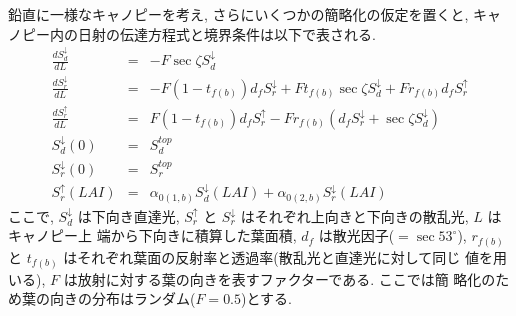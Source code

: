 鉛直に一様なキャノピーを考え, さらにいくつかの簡略化の仮定を置くと, キャ
ノピー内の日射の伝達方程式と境界条件は以下で表される. 
\begin{eqnarray}
 \frac{dS^{\downarrow}_d}{dL} &=& -F \sec\zeta S^{\downarrow}_d \\
 \frac{dS^{\downarrow}_r}{dL} &=& -F (1-t_{f(b)})d_f S^{\downarrow}_r
                                  +F t_{f(b)} \sec\zeta S^{\downarrow}_d 
                                  +F r_{f(b)} d_f S^{\uparrow}_r \\
 \frac{dS^{\uparrow}_r}{dL}   &=&  F (1-t_{f(b)})d_f S^{\uparrow}_r
                                  -F r_{f(b)} ( d_f S^{\downarrow}_r 
                                         + \sec\zeta S^{\downarrow}_d ) \\
 S^{\downarrow}_d(0) &=& S^{top}_d \\
 S^{\downarrow}_r(0) &=& S^{top}_r \\
 S^{\uparrow}_r(LAI) &=& \alpha_{0(1,b)}S^{\downarrow}_d(LAI)
                       + \alpha_{0(2,b)}S^{\downarrow}_r(LAI)
\end{eqnarray}
ここで, $S^{\downarrow}_d$ は下向き直達光, $S^{\uparrow}_r$ と
$S^{\downarrow}_r$ はそれぞれ上向きと下向きの散乱光, $L$ はキャノピー上
端から下向きに積算した葉面積, $d_f$ は散光因子($=\sec 53^{\circ}$),
$r_{f(b)}$ と $t_{f(b)}$ はそれぞれ葉面の反射率と透過率(散乱光と直達光に対して同じ
値を用いる), $F$ は放射に対する葉の向きを表すファクターである. ここでは簡
略化のため葉の向きの分布はランダム($F=0.5$)とする. 

